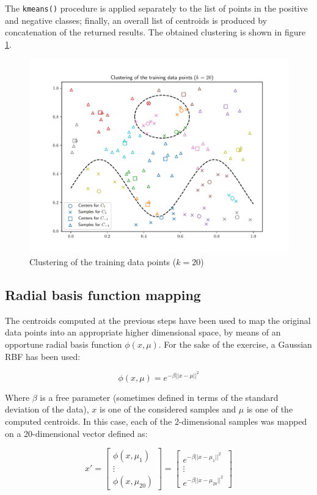 \documentclass[letterpaper,headings=standardclasses]{scrartcl}
\begin{document}
The \texttt{kmeans()} procedure is applied separately to the list of points in the positive and negative classes; finally, an overall list of centroids is produced by concatenation of the returned results. The obtained clustering is shown in figure \ref{data_20}.

\begin{figure}[h]
    \centering
    \includegraphics[width=0.7\linewidth]{data_20.pdf}
    \caption{Clustering of the training data points ($k = 20$)}
    \label{data_20}
\end{figure}

\subsection{Radial basis function mapping}

The centroids computed at the previous steps have been used to map the original data points into an appropriate higher dimensional space, by means of an opportune radial basis function $\phi(x, \mu)$. For the sake of the exercise, a Gaussian RBF has been used:

$$ \phi(x, \mu) = e^{-\beta ||x - \mu||^2} $$

Where $\beta$ is a free parameter (sometimes defined in terms of the standard deviation of the data), $x$ is one of the considered samples and $\mu$ is one of the computed centroids. In this case, each of the 2-dimensional samples was mapped on a 20-dimensional vector defined as:

$$ x' = \left[ \begin{matrix} \phi(x, \mu_1) \\ \vdots \\ \phi(x, \mu_{20}) \end{matrix} \right] = \left[ \begin{matrix} e^{-\beta ||x - \mu_1||^2} \\ \vdots \\ e^{-\beta ||x - \mu_{20}||^2} \end{matrix} \right] $$
\end{document}
